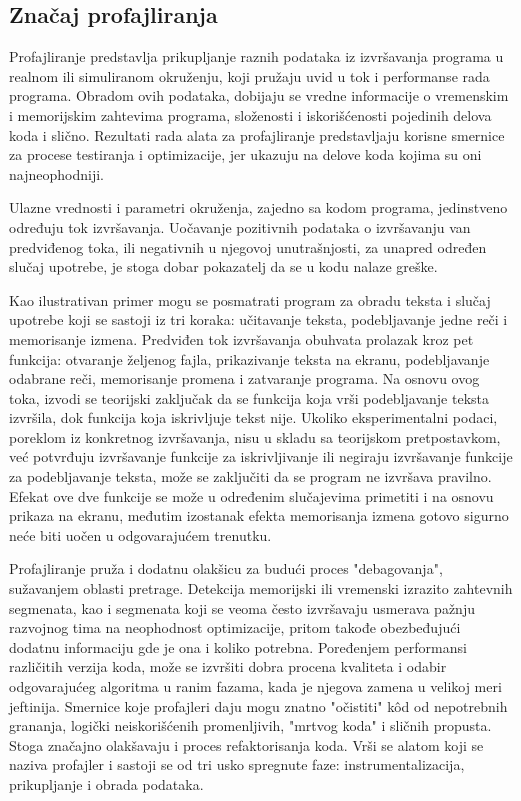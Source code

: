 \documentclass[12pt,oneside]{memoir}
\begin{document}
\subsection{Značaj profajliranja}

Profajliranje \cite{PGO, Verifikacija} predstavlja prikupljanje raznih podataka iz izvršavanja programa u realnom ili simuliranom okruženju, koji pružaju uvid u tok i performanse rada programa. Obradom ovih podataka, dobijaju se vredne informacije o vremenskim i memorijskim zahtevima programa, složenosti i iskorišćenosti pojedinih delova koda i slično. Rezultati rada alata za profajliranje predstavljaju korisne smernice za procese testiranja i optimizacije, jer ukazuju na delove koda kojima su oni najneophodniji.


Ulazne vrednosti i parametri okruženja, zajedno sa kodom programa, jedinstveno određuju tok izvršavanja. Uočavanje pozitivnih podataka o izvršavanju van predviđenog toka, ili negativnih u njegovoj unutrašnjosti, za unapred određen slučaj upotrebe, je stoga dobar pokazatelj da se u kodu nalaze greške.

Kao ilustrativan primer mogu se posmatrati program za obradu teksta i slučaj upotrebe koji se sastoji iz tri koraka: učitavanje teksta, podebljavanje jedne reči i memorisanje izmena. Predviđen tok izvršavanja obuhvata prolazak kroz pet funkcija: otvaranje željenog fajla, prikazivanje teksta na ekranu, podebljavanje odabrane reči, memorisanje promena i zatvaranje programa. Na osnovu ovog toka, izvodi se teorijski zaključak da se funkcija koja vrši podebljavanje teksta izvršila, dok funkcija koja iskrivljuje tekst nije. Ukoliko eksperimentalni podaci, poreklom iz konkretnog izvršavanja, nisu u skladu sa teorijskom pretpostavkom, već potvrđuju izvršavanje funkcije za iskrivljivanje ili negiraju izvršavanje funkcije za podebljavanje teksta, može se zaključiti da se program ne izvršava pravilno. Efekat ove dve funkcije se može u određenim slučajevima primetiti i na osnovu prikaza na ekranu, međutim izostanak efekta memorisanja izmena gotovo sigurno neće biti uočen u odgovarajućem trenutku.

Profajliranje pruža i dodatnu olakšicu za budući proces "debagovanja", sužavanjem oblasti pretrage. Detekcija memorijski ili vremenski izrazito zahtevnih segmenata, kao i segmenata koji se veoma često izvršavaju usmerava pažnju razvojnog tima na neophodnost optimizacije, pritom takođe obezbeđujući dodatnu informaciju gde je ona i koliko potrebna. Poređenjem performansi različitih verzija koda, može se izvršiti dobra procena kvaliteta i odabir odgovarajućeg algoritma u ranim fazama, kada je njegova zamena u velikoj meri jeftinija. Smernice koje profajleri daju mogu znatno "očistiti" k\^{o}d od nepotrebnih grananja, logički neiskorišćenih promenljivih, "mrtvog koda" i sličnih propusta. Stoga značajno olakšavaju i proces refaktorisanja koda. Vrši se alatom koji se naziva profajler i sastoji se od tri usko spregnute faze: instrumentalizacija, prikupljanje i obrada podataka.
\end{document}
